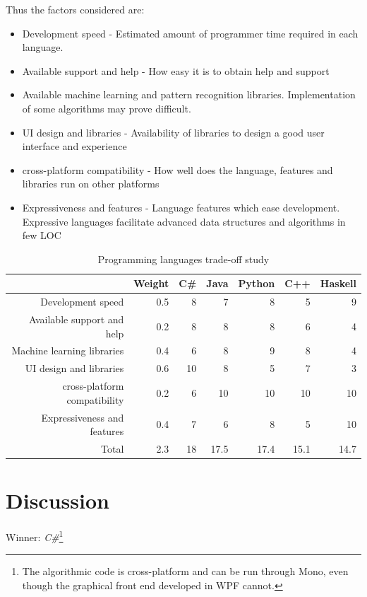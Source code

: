 Thus the factors considered are:
\begin{itemize}
\item Development speed - Estimated amount of programmer time required in each language.
\item Available support and help - How easy it is to obtain help and support
\item Available machine learning and pattern recognition libraries. Implementation of some algorithms may prove difficult.
\item \ac{UI} design and libraries - Availability of libraries to design a good user interface and experience
\item cross-platform compatibility - How well does the language, features and libraries run on other platforms
\item Expressiveness and features - Language features which ease development. Expressive languages facilitate advanced data structures and algorithms in few \ac{LOC}
\end{itemize}

\begin{table}[htbp]
  \centering
  \caption{Programming languages trade-off study}
    \begin{tabular}{rr|rrrrr}
    \toprule
          & Weight & C\#   & Java  & Python & C++   & Haskell \\
    \midrule
    Development speed & 0.5   & 8     & 7     & 8     & 5     & 9 \\
    Available support and help & 0.2   & 8     & 8     & 8     & 6     & 4 \\
    Machine learning libraries & 0.4   & 6     & 8     & 9     & 8     & 4 \\
    \acs{UI} design and libraries & 0.6   & 10    & 8     & 5     & 7     & 3 \\
    cross-platform compatibility & 0.2   & 6     & 10    & 10    & 10    & 10 \\
    Expressiveness and features & 0.4   & 7     & 6     & 8     & 5     & 10 \\
    \midrule
    Total & 2.3   & 18    & 17.5  & 17.4  & 15.1  & 14.7 \\
    \bottomrule
    \end{tabular}%
  \label{tab:languagetradeoff}%
\end{table}%

\section{Discussion}
Winner: \emph{C\#}\footnote{The algorithmic code is cross-platform and can be run through Mono, even though the graphical front end developed in \ac{WPF} cannot.}

